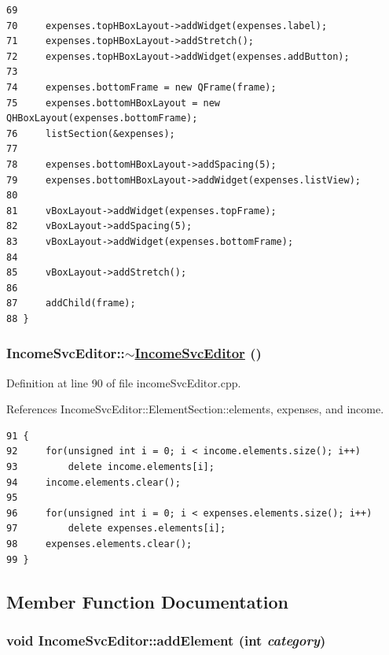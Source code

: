 \begin{verbatim}
69     
70     expenses.topHBoxLayout->addWidget(expenses.label);
71     expenses.topHBoxLayout->addStretch();
72     expenses.topHBoxLayout->addWidget(expenses.addButton);
73     
74     expenses.bottomFrame = new QFrame(frame);
75     expenses.bottomHBoxLayout = new QHBoxLayout(expenses.bottomFrame);
76     listSection(&expenses);
77     
78     expenses.bottomHBoxLayout->addSpacing(5);
79     expenses.bottomHBoxLayout->addWidget(expenses.listView);
80     
81     vBoxLayout->addWidget(expenses.topFrame);
82     vBoxLayout->addSpacing(5);
83     vBoxLayout->addWidget(expenses.bottomFrame);
84     
85     vBoxLayout->addStretch();
86     
87     addChild(frame);
88 }
\end{verbatim}\normalsize 


\hypertarget{classIncomeSvcEditor_a1}{
\subsubsection[$\sim$IncomeSvcEditor]{\setlength{\rightskip}{0pt plus 5cm}Income\-Svc\-Editor::$\sim$\hyperlink{classIncomeSvcEditor}{Income\-Svc\-Editor} ()}}
\label{classIncomeSvcEditor_a1}


Definition at line 90 of file income\-Svc\-Editor.cpp.

References Income\-Svc\-Editor::Element\-Section::elements, expenses, and income.

\footnotesize\begin{verbatim}91 {
92     for(unsigned int i = 0; i < income.elements.size(); i++)
93         delete income.elements[i];
94     income.elements.clear();
95     
96     for(unsigned int i = 0; i < expenses.elements.size(); i++)
97         delete expenses.elements[i];
98     expenses.elements.clear();
99 }
\end{verbatim}\normalsize 




\subsection{Member Function Documentation}
\hypertarget{classIncomeSvcEditor_k1}{
\subsubsection[addElement]{\setlength{\rightskip}{0pt plus 5cm}void Income\-Svc\-Editor::add\-Element (int {\em category})}}
\label{classIncomeSvcEditor_k1}


